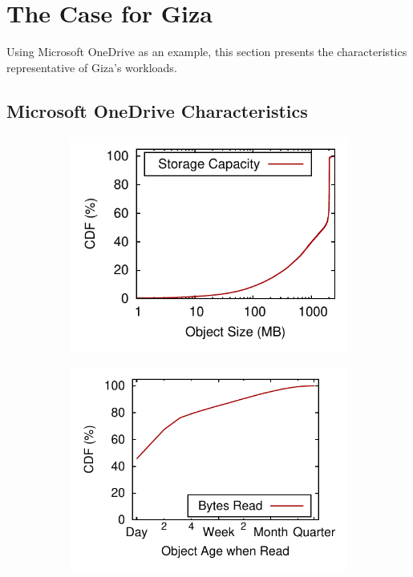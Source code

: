 \section{The Case for Giza}
\label{sec:motivation}

Using Microsoft OneDrive as an example, this section presents the characteristics representative of Giza's workloads.

\subsection{Microsoft OneDrive Characteristics}

\begin{figure}[tp]
\begin{subfigure}{.25\textwidth}
  \centering
  \includegraphics[width=\linewidth]{data/object_size-storage_capacity}
  \caption{}
  \label{fig:object_size-storage_capacity}
\end{subfigure}%
\begin{subfigure}{.25\textwidth}
  \centering
  \includegraphics[width=\linewidth]{data/write_read_gap-bytes_read}

\end{subfigure}
\end{figure}
